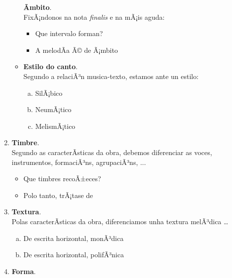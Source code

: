 \begin{multicols}{2}
\begin{enumerate}[1.-]
\begin{itemize}
            \textbf{Ãmbito}. \\
            FixÃ¡ndonos na nota \textit{finalis} e na mÃ¡is aguda:
                \begin{itemize}
                    \item
                    Que intervalo forman? \dotfill
                    \item
                    A melodÃ­a Ã© de Ã¡mbito \dotfill
                \end{itemize}
            \item %
            \textbf{Estilo do canto}. \\ Segundo a relaciÃ³n musica-texto, estamos ante un estilo:
                \begin{enumerate}[a)]
                  \item
                  SilÃ¡bico \dotfill
                  \item
                  NeumÃ¡tico \dotfill
                  \item
                  MelismÃ¡tico \dotfill
                \end{enumerate}
        \end{itemize}
        \item %
        \textbf{Timbre}. \\
        Segundo as caracterÃ­sticas da obra, debemos diferenciar as voces, instrumentos, formaciÃ³ns, agrupaciÃ³ns, ...
            \begin{itemize}
                \item 
                Que timbres recoÃ±eces? \dotfill
                \item
                Polo tanto, trÃ¡tase de \dotfill
            \end{itemize}
        \item %
        \textbf{Textura}. \\
        Polas caracterÃ­sticas da obra, diferenciamos unha textura melÃ³dica \ldots 
            \begin{enumerate}[a)]
                \item 
                De escrita horizontal, monÃ³dica
                \item 
                De escrita horizontal, polifÃ³nica
            \end{enumerate}
        \item %
        \textbf{Forma}. \\

\end{enumerate}
\end{multicols}
